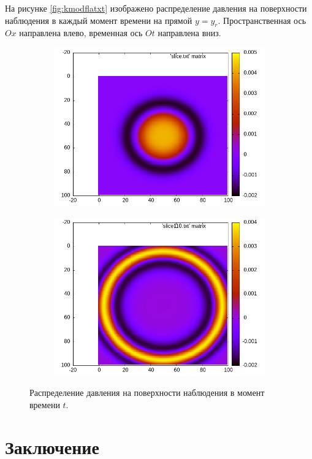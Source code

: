 \documentclass[a4paper, fontsize=14pt]{article}
\begin{document}
	На рисунке \ref{fig:kmodflatxt} изображено распределение давления на поверхности наблюдения в каждый момент времени на прямой $y=y_r$.
	Пространственная ось $Ox$ направлена влево, временная ось $Ot$ направлена вниз. 
	\begin{figure}[h]
		\begin{subfigure}{0.5\textwidth}
			\includegraphics[width=\textwidth]{slicet1.png}
		\end{subfigure}
		\begin{subfigure}{0.5\textwidth}
			\includegraphics[width=\textwidth]{slicet1.1.png}
		\end{subfigure}
		\caption{Распределение давления на поверхности наблюдения в момент времени $t$.}
	\end{figure}
	
	
	\clearpage
	
	
	\section*{Заключение} 
	
	\newpage
	
	
	\printbibliography
	
	\newpage
	
	
\end{document}
